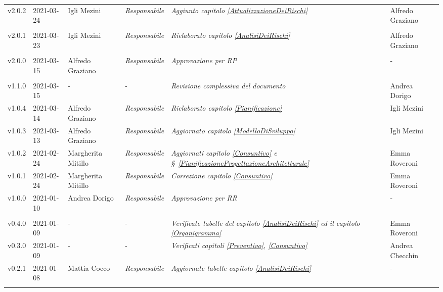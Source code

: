 {\begin{center}
\begin{longtable}[c]{|p{2cm-1\tabcolsep}|p{2cm}|p{3cm-2\tabcolsep}|p{}|p{}|p{4cm-2\tabcolsep}|}
		\hline
		\centering v2.0.2 & 2021-03-24 & Igli Mezini & \centering \textit{Responsabile} & \textit{Aggiunto capitolo \ref{AttualizzazioneDeiRischi} } & \centering Alfredo Graziano \\ \tabularnewline	
		\hline
		\centering v2.0.1 & 2021-03-23 & Igli Mezini & \centering \textit{Responsabile} & \textit{Rielaborato capitolo \ref{AnalisiDeiRischi} } & \centering Alfredo Graziano \\ \tabularnewline
		\hline
		\centering v2.0.0 & 2021-03-15 & Alfredo Graziano & \centering \textit{Responsabile} & \textit{Approvazione per RP} & \centering - \\ \tabularnewline
		\hline
		\centering v1.1.0 & 2021-03-15 & \centering - & \centering - & \textit{Revisione complessiva del documento} & Andrea Dorigo  \\ 
		\hline
		\centering v1.0.4 & 2021-03-14 & Alfredo Graziano & \centering \textit{Responsabile} & \textit{Rielaborato capitolo  \ref{Pianificazione}} & Igli Mezini  \\ 
		\hline
		\centering v1.0.3 & 2021-03-13 & Alfredo Graziano & \centering \textit{Responsabile} & \textit{Aggiornato capitolo \ref{ModelloDiSviluppo}} & Igli Mezini  \\ 
		\hline
		\centering v1.0.2 & 2021-02-24 & Margherita Mitillo & \centering \textit{Responsabile} & \textit{Aggiornati capitolo \ref{Consuntivo} e  \S~\ref{PianificazioneProgettazioneArchitetturale}} & Emma Roveroni  \\ 
		\hline
		\centering v1.0.1 & 2021-02-24 & Margherita Mitillo & \centering \textit{Responsabile} & \textit{Correzione capitolo \ref{Consuntivo}} & Emma Roveroni  \\ 
		\hline
		\centering v1.0.0 & 2021-01-10 & Andrea Dorigo & \centering \textit{Responsabile} & \textit{Approvazione per RR} & \centering -  \\ \tabularnewline
		\hline
		\centering v0.4.0 & 2021-01-09 & \centering - & \centering - & \textit{Verificate tabelle del capitolo \ref{AnalisiDeiRischi} ed il capitolo \ref{Organigramma}} & Emma Roveroni  \\ 
		\hline
		\centering v0.3.0 & 2021-01-09 & \centering - & \centering - & \textit{Verificati capitoli \ref{Preventivo}, \ref{Consuntivo}} & Andrea Checchin \\
		\hline
		\centering v0.2.1 & 2021-01-08 & Mattia Cocco & \centering \textit{Responsabile} & \textit{Aggiornate tabelle capitolo  \ref{AnalisiDeiRischi}} & \centering -  \\ \tabularnewline

\end{longtable}
\end{center}}
